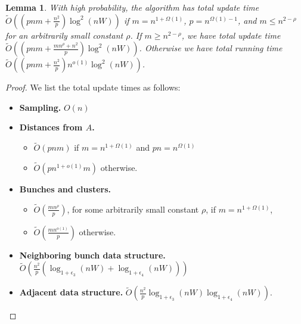 \documentclass[11pt]{article}
\newtheorem{lemma}[theorem]{Lemma}
\theoremstyle{definition}
\theoremstyle{remark}
\begin{document}
\begin{lemma}\label{lm:mult_time}
    With high probability, the algorithm \DynAPSPtwo has total update time $ \tilde O ((pnm + \tfrac{n^2}{ p})\log^2(nW)) $ if $m=n^{1+\Omega(1)}$, $p=n^{\Omega(1)-1}$, and $m\leq n^{2-\rho}$ for an arbitrarily small constant $\rho$. If $m\geq n^{2-\rho}$, we have total update time $ \tilde O ((pnm + \tfrac{mn^ \rho+n^2}{ p})\log^2(nW)) $. Otherwise we have total running time $ \tilde O ((pnm + \tfrac{n^2}{ p})n^{o(1)}\log^2(nW)) $.
\end{lemma}
\begin{proof}
    We list the total update times as follows:
\begin{itemize}
    \item \textbf{Sampling.} $O(n)$
    \item \textbf{Distances from $A$.}
    \begin{itemize}
	\item $\tilde{O}(pnm)$ if $m=n^{1+\Omega(1)}$ and $pn=n^{\Omega(1)}$
	\item $\tilde O(pn^{1+o(1)}m)$ otherwise.
    \end{itemize}
    \item \textbf{Bunches and clusters.} 
    \begin{itemize}
	\item $ \tilde O (\tfrac{mn^\rho}{p}) $, for some arbitrarily small constant $\rho$, if $m=n^{1+\Omega(1)}$, 
	\item $\tilde O(\tfrac{mn^{o(1)}}{p})$ otherwise.
    \end{itemize}
   \item \textbf{Neighboring bunch data structure.} $ \tilde O (\tfrac{n^2}{p} (\log_{1+\epsilon_3}(nW)+\log_{1+\epsilon_4}(nW))) $
   \item \textbf{Adjacent data structure.} $ \tilde O (\tfrac{n^2}{p}\log_{1+\epsilon_3}(nW)\log_{1+\epsilon_4}(nW)) $.

\end{itemize}
\end{proof}
\end{document}
